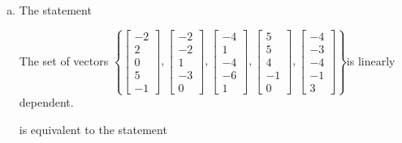\begin{exerciseAnswer}
\begin{enumerate}[(a)]
\item The statement 
\begin{center}\begin{minipage}{0.8\textwidth}
 The set of vectors \( \left\{ \left[\begin{array}{c}
-2 \\
2 \\
0 \\
5 \\
-1
\end{array}\right] , \left[\begin{array}{c}
-2 \\
-2 \\
1 \\
-3 \\
0
\end{array}\right] , \left[\begin{array}{c}
-4 \\
1 \\
-4 \\
-6 \\
1
\end{array}\right] , \left[\begin{array}{c}
5 \\
5 \\
4 \\
-1 \\
0
\end{array}\right] , \left[\begin{array}{c}
-4 \\
-3 \\
-4 \\
-1 \\
3
\end{array}\right] \right\} \)is linearly dependent.
\end{minipage}\end{center}
     is equivalent to the statement 
\begin{center}\begin{minipage}{0.8\textwidth}
 The vector equation \( x_{1} \left[\begin{array}{c}
-2 \\
2 \\
0 \\
5 \\
-1
\end{array}\right] + x_{2} \left[\begin{array}{c}
-2 \\
-2 \\

\end{array}
\end{minipage}
\end{center}
\end{enumerate}
\end{exerciseAnswer}

